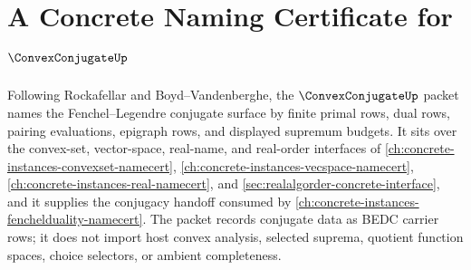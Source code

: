 \chapter{A Concrete Naming Certificate for $\ConvexConjugateUp$}
\label{ch:concrete-instances-convex-conjugate-namecert}

Following Rockafellar and Boyd--Vandenberghe, the $\ConvexConjugateUp$ packet names the Fenchel--Legendre conjugate surface by finite primal rows, dual rows, pairing evaluations, epigraph rows, and displayed supremum budgets. It sits over the convex-set, vector-space, real-name, and real-order interfaces of \autoref{ch:concrete-instances-convexset-namecert}, \autoref{ch:concrete-instances-vecspace-namecert}, \autoref{ch:concrete-instances-real-namecert}, and \autoref{sec:realalgorder-concrete-interface}, and it supplies the conjugacy handoff consumed by \autoref{ch:concrete-instances-fenchelduality-namecert}. The packet records conjugate data as BEDC carrier rows; it does not import host convex analysis, selected suprema, quotient function spaces, choice selectors, or ambient completeness.

